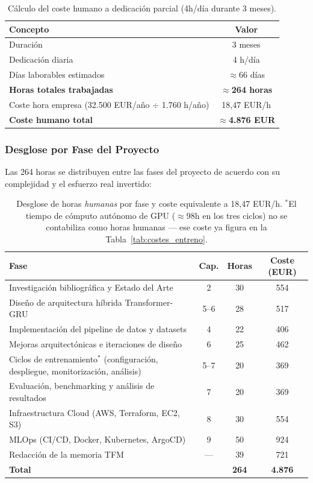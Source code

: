 \begin{table}[H]
\centering
\begin{tabularx}{\textwidth}{|X|c|}
\hline
\textbf{Concepto} & \textbf{Valor} \\ \hline
Duración & 3 meses \\ \hline
Dedicación diaria & 4 h/día \\ \hline
Días laborables estimados & $\approx$66 días \\ \hline
\textbf{Horas totales trabajadas} & \textbf{$\approx$264 horas} \\ \hline
Coste hora empresa (32.500 EUR/año $\div$ 1.760 h/año) & 18,47 EUR/h \\ \hline
\textbf{Coste humano total} & \textbf{$\approx$4.876 EUR} \\ \hline
\end{tabularx}
\caption{Cálculo del coste humano a dedicación parcial (4h/día durante 3 meses).}
\label{tab:coste_horas}
\end{table}

\subsubsection{Desglose por Fase del Proyecto}

Las 264 horas se distribuyen entre las fases del proyecto de acuerdo con su complejidad y el esfuerzo real invertido:

\begin{table}[H]
\centering
\begin{tabularx}{\textwidth}{|X|c|c|c|}
\hline
\textbf{Fase} & \textbf{Cap.} & \textbf{Horas} & \textbf{Coste (EUR)} \\ \hline
Investigación bibliográfica y Estado del Arte & 2 & 30 & 554 \\ \hline
Diseño de arquitectura híbrida Transformer-GRU & 5--6 & 28 & 517 \\ \hline
Implementación del pipeline de datos y datasets & 4 & 22 & 406 \\ \hline
Mejoras arquitectónicas e iteraciones de diseño & 6 & 25 & 462 \\ \hline
Ciclos de entrenamiento$^{*}$ (configuración, despliegue, monitorización, análisis) & 5--7 & 20 & 369 \\ \hline
Evaluación, benchmarking y análisis de resultados & 7 & 20 & 369 \\ \hline
Infraestructura Cloud (AWS, Terraform, EC2, S3) & 8 & 30 & 554 \\ \hline
MLOps (CI/CD, Docker, Kubernetes, ArgoCD) & 9 & 50 & 924 \\ \hline
Redacción de la memoria TFM & --- & 39 & 721 \\ \hline
\textbf{Total} & & \textbf{264} & \textbf{4.876} \\ \hline
\end{tabularx}
\caption{Desglose de horas \textit{humanas} por fase y coste equivalente a 18,47 EUR/h. $^{*}$El tiempo de cómputo autónomo de GPU ($\approx$98h en los tres ciclos) no se contabiliza como horas humanas --- ese coste ya figura en la Tabla~\ref{tab:costes_entreno}.}
\label{tab:coste_fases}
\end{table}

